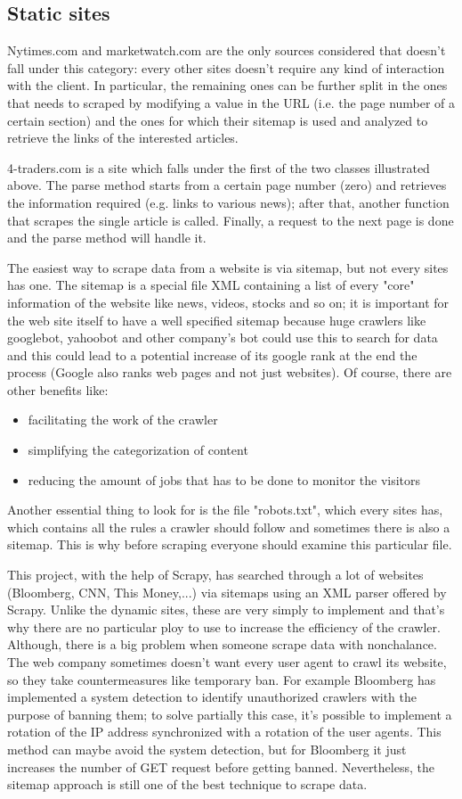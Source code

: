 \subsection{Static sites}
Nytimes.com and marketwatch.com are the only sources considered that doesn't fall under this category: every other sites doesn't require any kind of interaction with the client. In particular, the remaining ones can be further split in the ones that needs to scraped by modifying a value in the URL (i.e. the page number of a certain section) and the ones for which their sitemap is used and analyzed to retrieve the links of the interested articles. 
\par
4-traders.com is a site which falls under the first of the two classes illustrated above. The parse method starts from a certain page number (zero) and retrieves the information required (e.g. links to various news); after that, another function that scrapes the single article is called. Finally, a request to the next page is done and the parse method will handle it.
\par 
The easiest way to scrape data from a website is via sitemap, but not every sites has one. 
The sitemap is a special file XML containing a list of every "core" information of the website like news, videos, stocks and so on; it is important for the web site itself to have a well specified sitemap because huge crawlers like googlebot, yahoobot and other company's bot could use this to search for data and this could lead to a potential increase of its google rank at the end the process (Google also ranks web pages and not just websites). 
Of course, there are other benefits like:
\begin{itemize}
	\item facilitating the work of the crawler
	\item simplifying the categorization of content
	\item reducing the amount of jobs that has to be done to monitor the visitors
\end{itemize}
Another essential thing to look for is the file "robots.txt", which every sites has, which contains all the rules a crawler should follow and sometimes there is also a sitemap. 
This is why before scraping everyone should examine this particular file. 
\par 
This project, with the help of Scrapy, has searched through a lot of websites (Bloomberg, CNN, This Money,...) via sitemaps using an XML parser offered by Scrapy. 
Unlike the dynamic sites, these are very simply to implement and that's why there are no particular ploy to use to increase the efficiency of the crawler. 
Although, there is a big problem when someone scrape data with nonchalance. 
The web company sometimes doesn't want every user agent to crawl its website, so they take countermeasures like temporary ban. 
For example Bloomberg has implemented a system detection to identify unauthorized crawlers with the purpose of banning them; to solve partially this case, it's possible to implement a rotation of the IP address synchronized with a rotation of the user agents. 
This method can maybe avoid the system detection, but for Bloomberg it just increases the number of GET request before getting banned. 
Nevertheless, the sitemap approach is still one of the best technique to scrape data.
